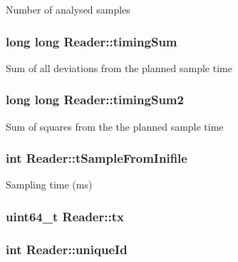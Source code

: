 Number of analysed samples \hypertarget{classReader_ab185760a9e7235b20f9cb21db44d0663}{
\subsubsection[{timing\-Sum}]{\setlength{\rightskip}{0pt plus 5cm}long long Reader\-::timing\-Sum\hspace{0.3cm}{\ttfamily [private]}}}\label{classReader_ab185760a9e7235b20f9cb21db44d0663}
Sum of all deviations from the planned sample time \hypertarget{classReader_a8a8de149490f7fe3c01413453c3d0a50}{
\subsubsection[{timing\-Sum2}]{\setlength{\rightskip}{0pt plus 5cm}long long Reader\-::timing\-Sum2\hspace{0.3cm}{\ttfamily [private]}}}\label{classReader_a8a8de149490f7fe3c01413453c3d0a50}
Sum of squares from the the planned sample time \hypertarget{classReader_abe8094976b8f244a539e34689dda91bc}{
\subsubsection[{t\-Sample\-From\-Inifile}]{\setlength{\rightskip}{0pt plus 5cm}int Reader\-::t\-Sample\-From\-Inifile\hspace{0.3cm}{\ttfamily [private]}}}\label{classReader_abe8094976b8f244a539e34689dda91bc}
Sampling time (ms) \hypertarget{classReader_acb6c6053d7bd278014e04c34fdad4e0e}{
\subsubsection[{tx}]{\setlength{\rightskip}{0pt plus 5cm}uint64\-\_\-t Reader\-::tx\hspace{0.3cm}{\ttfamily [private]}}}\label{classReader_acb6c6053d7bd278014e04c34fdad4e0e}
\hypertarget{classReader_a2df27c47ac46939a756ab78b71690d44}{
\subsubsection[{unique\-Id}]{\setlength{\rightskip}{0pt plus 5cm}int Reader\-::unique\-Id\hspace{0.3cm}{\ttfamily [private]}}}\label{classReader_a2df27c47ac46939a756ab78b71690d44}
